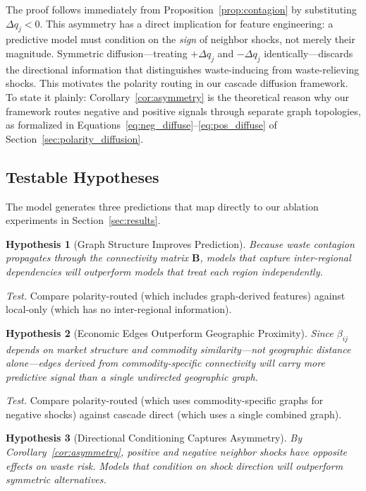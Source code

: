\documentclass[preprint,12pt,authoryear]{elsarticle}
\newtheorem{hypothesis}{Hypothesis}
\begin{document}
The proof follows immediately from Proposition~\ref{prop:contagion} by substituting $\Delta q_j < 0$.
This asymmetry has a direct implication for feature engineering: a predictive model must condition on the \emph{sign} of neighbor shocks, not merely their magnitude.
Symmetric diffusion---treating $+\Delta q_j$ and $-\Delta q_j$ identically---discards the directional information that distinguishes waste-inducing from waste-relieving shocks.
This motivates the polarity routing in our cascade diffusion framework. To state it plainly: Corollary~\ref{cor:asymmetry} is the theoretical reason why our framework routes negative and positive signals through separate graph topologies, as formalized in Equations~\eqref{eq:neg_diffuse}--\eqref{eq:pos_diffuse} of Section~\ref{sec:polarity_diffusion}.

\subsection{Testable Hypotheses}
\label{sec:hypotheses}

The model generates three predictions that map directly to our ablation experiments in Section~\ref{sec:results}.

\begin{hypothesis}[Graph Structure Improves Prediction]
\label{hyp:graph}
Because waste contagion propagates through the connectivity matrix $\mathbf{B}$, models that capture inter-regional dependencies will outperform models that treat each region independently.
\end{hypothesis}

\noindent\textit{Test.}\; Compare polarity-routed (which includes graph-derived features) against local-only (which has no inter-regional information).

\begin{hypothesis}[Economic Edges Outperform Geographic Proximity]
\label{hyp:edges}
Since $\beta_{ij}$ depends on market structure and commodity similarity---not geographic distance alone---edges derived from commodity-specific connectivity will carry more predictive signal than a single undirected geographic graph.
\end{hypothesis}

\noindent\textit{Test.}\; Compare polarity-routed (which uses commodity-specific graphs for negative shocks) against cascade direct (which uses a single combined graph).

\begin{hypothesis}[Directional Conditioning Captures Asymmetry]
\label{hyp:asymmetry}
By Corollary~\ref{cor:asymmetry}, positive and negative neighbor shocks have opposite effects on waste risk.
Models that condition on shock direction will outperform symmetric alternatives.
\end{hypothesis}
\end{document}
